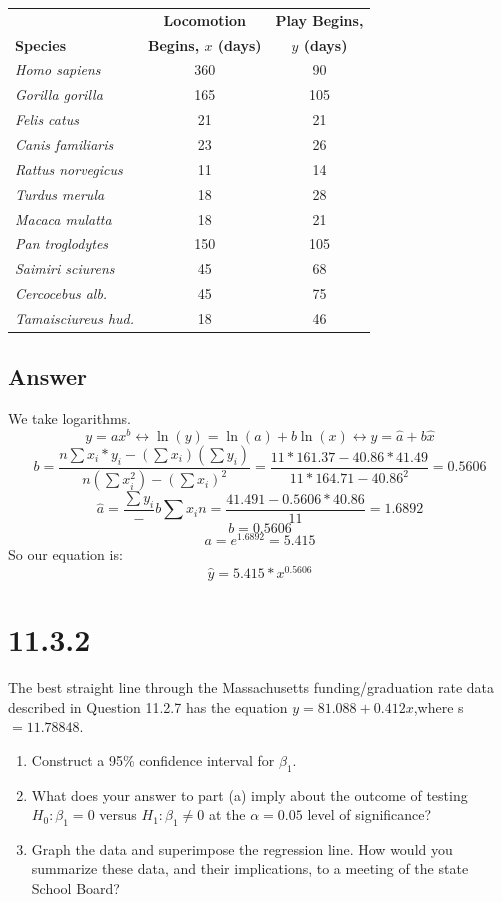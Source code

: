 \documentclass[svgnames]{article}
\begin{document}
\begin{table}[H]
\centering
 \begin{tabular}{l c c} 
\hline 
\bf  & \bf  Locomotion &\bf Play Begins, \\
\bf Species & \bf  Begins, $x$ (days) &\bf $y$ (days) \\
\hline
\textit{Homo sapiens} & 360 & 90  \\
\textit{Gorilla gorilla} & 165 & 105  \\
\textit{Felis catus} & 21 & 21  \\
\textit{Canis familiaris} & 23 & 26  \\
\textit{Rattus norvegicus} & 11 & 14  \\
\textit{Turdus merula} & 18 & 28  \\
\textit{Macaca mulatta} & 18 & 21  \\
\textit{Pan troglodytes} & 150 & 105  \\
\textit{Saimiri sciurens} & 45 & 68  \\
\textit{Cercocebus alb.} & 45 & 75  \\
\textit{Tamaisciureus hud.} & 18 & 46  \\
 \hline
 \end{tabular}
\end{table}

\subsection*{Answer}
We take logarithms.
$$y=ax^b \leftrightarrow \ln(y) = \ln(a) + b \ln(x)  \leftrightarrow \hat{y} = \hat{a} +b \hat{x}$$
$$b=\frac{n\sum x_i*y_i-(\sum x_i)(\sum y_i)}{n(\sum x_i^2)-(\sum x_i)^2}=\frac{11*161.37 - 40.86*41.49}
{11*164.71-40.86^2}=0.5606$$
$$\hat{a}=\frac{\sum y_i} - b\sum x_i{n}=\frac{41.491 - 0.5606*40.86}{11}=1.6892$$
$$b=0.5606$$
$$a=e^{1.6892}=5.415$$
So our equation is:
$$\hat{y}=5.415*x^{0.5606}$$

\section{11.3.2}
The best straight line through the Massachusetts funding/graduation rate data described in Question 11.2.7 has the equation $y = 81.088+0.412x$,where s$ = 11.78848$. 

\begin{enumerate}[label=\alph*]
\item Construct a 95\% confidence interval for $\beta _1$.
\item What does your answer to part (a) imply about the outcome of testing $H_0: \beta_1 = 0$ versus $H_1: \beta_1 \neq 0$ at the $\alpha = 0.05$ level of significance?
\item  Graph the data and superimpose the regression line. How would you summarize these data, and their implications, to a meeting of the state School Board?
\end{enumerate}
\end{document}
